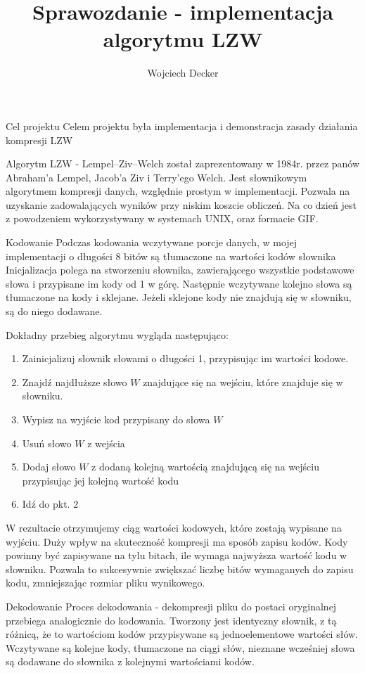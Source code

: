 \documentclass{article}
\author{Wojciech Decker}
\title{Sprawozdanie - implementacja algorytmu LZW}
\begin{document}
\maketitle
\tableofcontents
  \begin{section}{Cel projektu}
    Celem projektu była implementacja i demonstracja zasady działania kompresji LZW
  \end{section}
  \begin{section}{Algorytm}
    LZW - Lempel–Ziv–Welch został zaprezentowany w 1984r. przez panów Abraham'a Lempel, Jacob'a Ziv i Terry'ego Welch.
    Jest słownikowym algorytmem kompresji danych, względnie prostym w implementacji. 
    Pozwala na uzyskanie zadowalających wyników przy niskim koszcie obliczeń. 
    Na co dzień jest z powodzeniem wykorzystywany w systemach UNIX, oraz formacie GIF.

    \begin{subsection}{Kodowanie}
      Podczas kodowania wczytywane porcje danych, w mojej implementacji o długości 8 bitów są tłumaczone na wartości kodów słownika
      Inicjalizacja polega na stworzeniu słownika, zawierającego wszystkie podstawowe słowa i przypisane im kody od 1 w górę.
      Następnie wczytywane kolejno słowa są tłumaczone na kody i sklejane. 
      Jeżeli sklejone kody nie znajdują się w słowniku, są do niego dodawane.

      Dokładny przebieg algorytmu wygląda następująco:
      \begin{enumerate}
	\item Zainicjalizuj słownik słowami o długości 1, przypisując im wartości kodowe.
	\item Znajdź najdłuższe słowo $W$ znajdujące się na wejściu, które znajduje się w słowniku.
	\item Wypisz na wyjście kod przypisany do słowa $W$
	\item Usuń słowo $W$ z wejścia
	\item Dodaj słowo $W$ z dodaną kolejną wartością znajdującą się na wejściu
	  przypisując jej kolejną wartość kodu
	\item Idź do pkt. 2 
      \end{enumerate}
      W rezultacie otrzymujemy ciąg wartości kodowych, które zostają wypisane na wyjściu.
      Duży wpływ na skuteczność kompresji ma sposób zapisu kodów.
      Kody powinny być zapisywane na tylu bitach, ile wymaga najwyższa wartość kodu w słowniku.
      Pozwala to sukcesywnie zwiększać liczbę bitów wymaganych do zapisu kodu, zmniejszając rozmiar pliku wynikowego.
    \end{subsection}
    \begin{subsection}{Dekodowanie}
      Proces dekodowania - dekompresji pliku do postaci oryginalnej przebiega analogicznie do kodowania.
      Tworzony jest identyczny słownik, z tą różnicą, że to wartościom kodów przypisywane są jednoelementowe
	wartości słów.
      Wczytywane są kolejne kody, tłumaczone na ciągi słów, nieznane wcześniej słowa są dodawane do słownika z kolejnymi wartościami kodów.


\end{subsection}
\end{section}
\end{document}
